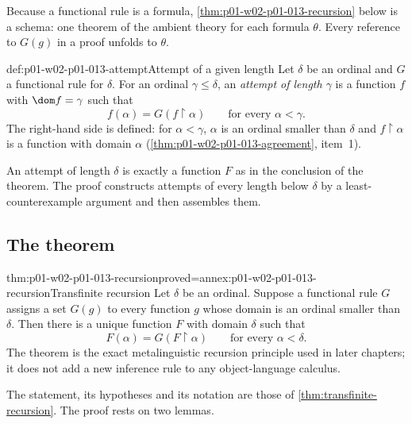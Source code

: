 Because a functional rule is a formula, \cref{thm:p01-w02-p01-013-recursion}
below is a schema: one theorem of the ambient theory for each formula
\(\theta\). Every reference to \(G(g)\) in a proof unfolds to \(\theta\).

\begin{hbdefinition}{def:p01-w02-p01-013-attempt}{Attempt of a given length}
Let \(\delta\) be an ordinal and \(G\) a functional rule for \(\delta\). For
an ordinal \(\gamma\leq\delta\), an \emph{attempt of length \(\gamma\)} is a
function \(f\) with \(\dom f=\gamma\) such that
\[
  f(\alpha)=G(f\mathbin{\upharpoonright}\alpha)
  \qquad\text{for every }\alpha<\gamma.
\]
The right-hand side is defined: for \(\alpha<\gamma\), \(\alpha\) is an
ordinal smaller than \(\delta\) and \(f\mathbin{\upharpoonright}\alpha\) is a
function with domain \(\alpha\) (\cref{thm:p01-w02-p01-013-agreement},
item~1).
\end{hbdefinition}

An attempt of length \(\delta\) is exactly a function \(F\) as in the
conclusion of the theorem. The proof constructs attempts of every length
below \(\delta\) by a least-counterexample argument and then assembles them.

\subsection{The theorem}
\label{sec:p01-w02-p01-013-theorem}

\begin{hbtheorem}{thm:p01-w02-p01-013-recursion}{proved=annex:p01-w02-p01-013-recursion}{Transfinite recursion}
Let \(\delta\) be an ordinal. Suppose a functional rule \(G\) assigns a set
\(G(g)\) to every function \(g\) whose domain is an ordinal smaller than
\(\delta\). Then there is a unique function \(F\) with domain \(\delta\) such
that
\[
 F(\alpha)=G(F\mathbin{\upharpoonright}\alpha)
 \qquad\text{for every }\alpha<\delta.
\]
The theorem is the exact metalinguistic recursion principle used in later
chapters; it does not add a new inference rule to any object-language
calculus.
\end{hbtheorem}

The statement, its hypotheses and its notation are those of
\cref{thm:transfinite-recursion}. The proof rests on two lemmas.

